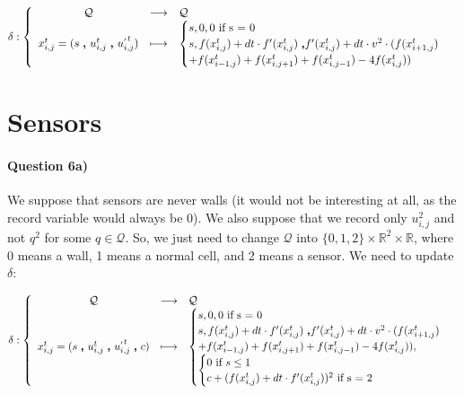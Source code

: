 \documentclass[a4paper,12pt]{article}
\begin{document}
\begin{eqnarray*}
\delta : \left \{ \begin{array}{c c l }
  \mathcal{Q} & \longrightarrow & \mathcal{Q} \\
  x_{i,j}^t = (s \ \pmb{,} \ u^{t}_{i,j}\ \pmb{,} \ u^{_{'} t}_{i,j}) & \longmapsto &
  \begin{cases}s, 0, 0\mbox{ if s = 0}\\
    s, f(x^{t}_{i,j}) + dt \cdot f'(x^t_{i,j})\ \pmb{,} f'(x^t_{i,j}) + dt \cdot v^2 \cdot (f(x^t_{i+1,j}) \\+ f(x^t_{i-1, j}) + f(x^t_{i, j+1}) + f(x^t_{i, j-1}) - 4 f(x^t_{i, j})) 
    \end{cases}\\
  \end{array} \right .
\end{eqnarray*}

\section{Sensors}

\paragraph{Question 6a)} We suppose that sensors are never walls (it would not be interesting at all, as the record variable would always be 0). We also suppose that we record only $u_{i,j}^2$ and not $q^2$ for some $q \in \mathcal{Q}$. So, we just need to change $\mathcal{Q}$ into $\{0,1,2\} \times \mathbb{R}^2 \times \mathbb{R}$, where 0 means a wall, 1 means a normal cell, and 2 means a sensor. We need to update $\delta$:

\begin{eqnarray*}
\delta : \left \{ \begin{array}{c c l }
  \mathcal{Q} & \longrightarrow & \mathcal{Q} \\
  x_{i,j}^t = (s \ \pmb{,} \ u^{t}_{i,j}\ \pmb{,} \ u^{_{'} t}_{i,j} \ \pmb{,} \ c) & \longmapsto &
  \begin{cases}s, 0, 0\mbox{ if s = 0}\\
    s, f(x^{t}_{i,j}) + dt \cdot f'(x^t_{i,j})\ \pmb{,} f'(x^t_{i,j}) + dt \cdot v^2 \cdot (f(x^t_{i+1,j}) \\+ f(x^t_{i-1, j}) + f(x^t_{i, j+1}) + f(x^t_{i, j-1}) - 4 f(x^t_{i, j})),\\
    \begin{cases} 0 \mbox{ if }s \leq 1\\
      c + (f(x^{t}_{i,j}) + dt \cdot f'(x^t_{i,j}))^2 \mbox{ if s = 2} \\
    \end{cases}
  \end{cases}
  \end{array} \right .
\end{eqnarray*}
\end{document}
